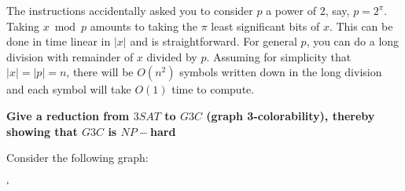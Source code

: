 \documentclass[2pt]{scrartcl}
\begin{document}
\begin{multicols}{6}
    The instructions accidentally asked you to consider $p$ a power of 2,
    say, $p=2^\pi$.  Taking $x\bmod p$ amounts to taking the $\pi$ least
    significant bits of $x$.  This can be done in time linear in $|x|$ and
    is straightforward.  For general $p$, you can do a long division with
    remainder of $x$ divided by $p$.  Assuming for simplicity that
    $|x|=|p|=n$, there will be $O(n^2)$ symbols written down in the long
    division and each symbol will take $O(1)$ time to compute.

    {\bf Give a reduction from $3SAT$ to $G3C$ (graph 3-colorability), thereby showing that $G3C$ is $NP-$hard}

    Consider the following graph:

    \begin{center}
      `
\end{center}
\end{multicols}
\end{document}
